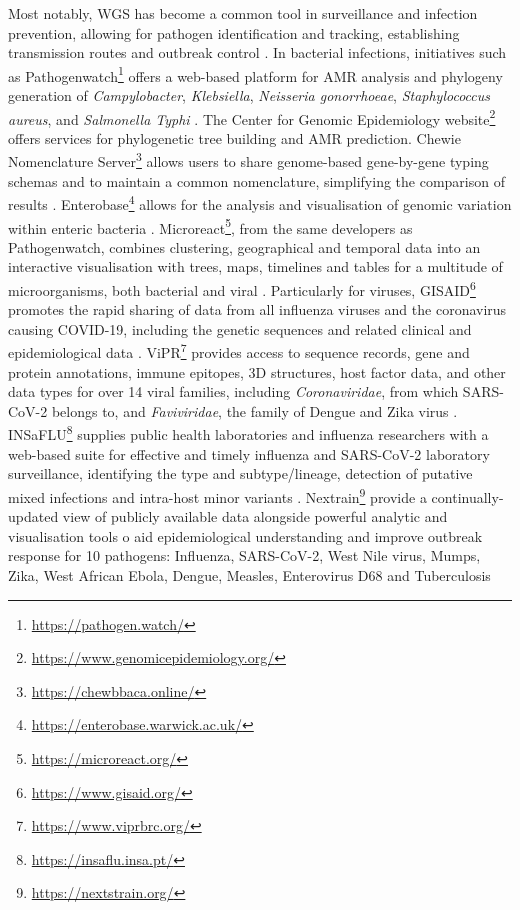 Most notably, WGS has become a common tool in surveillance and infection prevention, allowing for pathogen identification and tracking, establishing transmission routes and outbreak control \citep{lo_genomics_2020}. In bacterial infections, initiatives such as Pathogenwatch\footnote{\url{https://pathogen.watch/}} offers a web-based platform for AMR analysis and phylogeny generation of \textit{Campylobacter}, \textit{Klebsiella}, \textit{Neisseria gonorrhoeae}, \textit{Staphylococcus aureus}, and \textit{Salmonella Typhi} \citep{afolayan_overcoming_2021}. The Center for Genomic Epidemiology website\footnote{\url{https://www.genomicepidemiology.org/}} offers services for phylogenetic tree building and AMR prediction. Chewie Nomenclature Server\footnote{\url{https://chewbbaca.online/}} allows users to share genome-based gene-by-gene typing schemas and to maintain a common nomenclature, simplifying the comparison of results \citep{mamede_chewie_2021}. Enterobase\footnote{\url{https://enterobase.warwick.ac.uk/}} allows for the analysis and visualisation of genomic variation within enteric bacteria \citep{zhou_enterobase_2020}. Microreact\footnote{\url{https://microreact.org/}}, from the same developers as Pathogenwatch, combines clustering, geographical and temporal data into an interactive visualisation with trees, maps, timelines and tables for a multitude of microorganisms, both bacterial and viral \citep{argimon_microreact_nodate}. Particularly for viruses, GISAID\footnote{\url{https://www.gisaid.org/}}  promotes the rapid sharing of data from all influenza viruses and the coronavirus causing COVID-19, including the genetic sequences and related clinical and epidemiological data \citep{shu_gisaid_2017}. ViPR\footnote{\url{https://www.viprbrc.org/}} provides access to sequence records, gene and protein annotations, immune epitopes, 3D structures, host factor data, and other data types for over 14 viral families, including \textit{Coronaviridae}, from which SARS-CoV-2 belongs to, and \textit{Faviviridae}, the family of Dengue and Zika virus \citep{pickett_virus_2012}. INSaFLU\footnote{\url{https://insaflu.insa.pt/}} supplies public health laboratories and influenza researchers with a web-based suite for effective and timely influenza and SARS-CoV-2 laboratory surveillance, identifying the type and subtype/lineage, detection of putative mixed infections and intra-host minor variants \citep{borges_insaflu_2018}. Nextrain\footnote{\url{https://nextstrain.org/}} provide a continually-updated view of publicly available data alongside powerful analytic and visualisation tools o aid epidemiological understanding and improve outbreak response for 10 pathogens: Influenza, SARS-CoV-2, West Nile virus, Mumps, Zika, West African Ebola, Dengue, Measles, Enterovirus D68 and Tuberculosis \citep{hadfield_nextstrain_2018}

